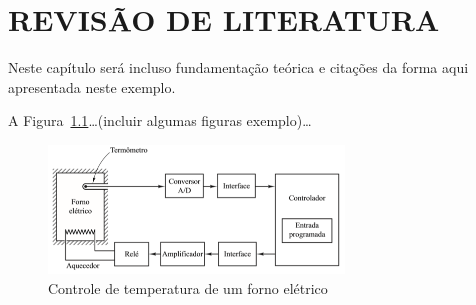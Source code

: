 \chapter{REVISÃO DE LITERATURA}\label{chap:fundamentacaoTeorica}

Neste capítulo será incluso fundamentação teórica e citações da forma aqui apresentada neste exemplo.\cite{Ogata2010}

A Figura~\ref{fig:figura1}\ldots (incluir algumas figuras exemplo)\ldots

\begin{figure}[!htb]
    \centering
    \caption{Controle de temperatura de um forno elétrico}\label{fig:figura1}
    \includegraphics[width=0.7\textwidth]{figuras/figu1.png}
\end{figure}
